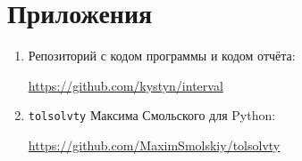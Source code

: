 \section{Приложения} \label{app}

\begin{enumerate}
	\item Репозиторий с кодом программы и кодом отчёта:
	
	\href{https://github.com/kystyn/interval}{https://github.com/kystyn/interval}
	
	\item \texttt{tolsolvty} Максима Смольского для Python:
	
	\href{https://github.com/MaximSmolskiy/tolsolvty}{https://github.com/MaximSmolskiy/tolsolvty}	
\end{enumerate}